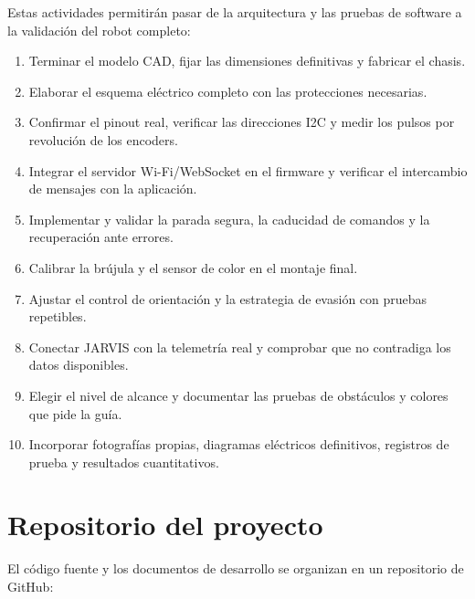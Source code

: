 \documentclass[journal]{IEEEtran}
\begin{document}
Estas actividades permitirán pasar de la arquitectura y las pruebas de software a la validación del robot completo:

\begin{enumerate}[1.]
    \item Terminar el modelo CAD, fijar las dimensiones definitivas y fabricar el chasis.

    \item Elaborar el esquema eléctrico completo con las protecciones necesarias.

    \item Confirmar el pinout real, verificar las direcciones I2C y medir los pulsos por revolución de los encoders.

    \item Integrar el servidor Wi-Fi/WebSocket en el firmware y verificar el intercambio de mensajes con la aplicación.

    \item Implementar y validar la parada segura, la caducidad de comandos y la recuperación ante errores.

    \item Calibrar la brújula y el sensor de color en el montaje final.

    \item Ajustar el control de orientación y la estrategia de evasión con pruebas repetibles.

    \item Conectar JARVIS con la telemetría real y comprobar que no contradiga los datos disponibles.

    \item Elegir el nivel de alcance y documentar las pruebas de obstáculos y colores que pide la guía.

    \item Incorporar fotografías propias, diagramas eléctricos definitivos, registros de prueba y resultados cuantitativos.
\end{enumerate}


\section{Repositorio del proyecto}

El código fuente y los documentos de desarrollo se organizan en un repositorio de GitHub:
\end{document}
